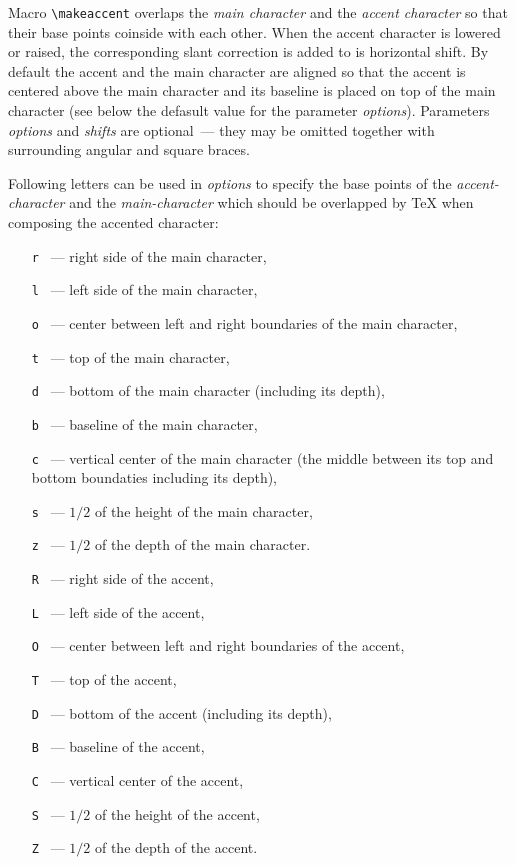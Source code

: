 Macro \verb?\makeaccent? overlaps the {\em main character}
and the {\em accent character} so that their base points coinside
with each other. When the accent character is lowered or raised, the
corresponding slant correction is added to is horizontal shift.
By default the accent and
the main character are aligned so that the accent
is centered above the main character and its baseline is placed on top
of the main character (see below the defasult value
for the parameter {\em options}).
Parameters {\em options} and {\em shifts} are optional~---
they may be omitted together with surrounding angular and square
braces.

Following letters can be used in {\em options}
to specify the base points of
the {\em accent-character} and the {\em main-character}
which should be overlapped by \TeX{} when composing the accented
character:
\begin{itemize}
\item[\texttt{r}]~--- right side of the main character,
\item[\texttt{l}]~--- left side of the main character,
\item[\texttt{o}]~--- center between left and right boundaries
                      of the main character,
\item[\texttt{t}]~--- top of the main character,
\item[\texttt{d}]~--- bottom of the main character (including its depth),
\item[\texttt{b}]~--- baseline of the main character,
\item[\texttt{c}]~--- vertical center of the main character
                      (the middle between its top and bottom
                      boundaties including its depth),
\item[\texttt{s}]~--- $1/2$ of the height of the main character,
\item[\texttt{z}]~--- $1/2$ of the depth of the main character.
\item[\texttt{R}]~--- right side of the accent,
\item[\texttt{L}]~--- left side of the accent,
\item[\texttt{O}]~--- center between left and right boundaries
                      of the accent,
\item[\texttt{T}]~--- top of the accent,
\item[\texttt{D}]~--- bottom of the accent (including its depth),
\item[\texttt{B}]~--- baseline of the accent,
\item[\texttt{C}]~--- vertical center of the accent,
\item[\texttt{S}]~--- $1/2$ of the height of the accent,
\item[\texttt{Z}]~--- $1/2$ of the depth of the accent.
\end{itemize}
